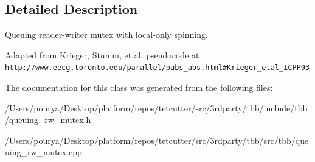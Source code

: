 \subsection{Detailed Description}
Queuing reader-\/writer mutex with local-\/only spinning. 

Adapted from Krieger, Stumm, et al. pseudocode at \href{http://www.eecg.toronto.edu/parallel/pubs_abs.html#Krieger_etal_ICPP93}{\tt http\+://www.\+eecg.\+toronto.\+edu/parallel/pubs\+\_\+abs.\+html\#\+Krieger\+\_\+etal\+\_\+\+I\+C\+P\+P93} 

The documentation for this class was generated from the following files\+:\begin{DoxyCompactItemize}
\item 
/\+Users/pourya/\+Desktop/platform/repos/tetcutter/src/3rdparty/tbb/include/tbb/queuing\+\_\+rw\+\_\+mutex.\+h\item 
/\+Users/pourya/\+Desktop/platform/repos/tetcutter/src/3rdparty/tbb/src/tbb/queuing\+\_\+rw\+\_\+mutex.\+cpp\end{DoxyCompactItemize}
